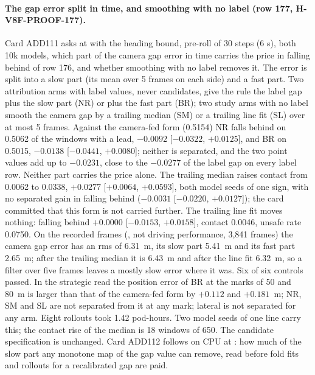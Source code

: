 \paragraph{The gap error split in time, and smoothing with no label (row 177, H-V8F-PROOF-177).} Card ADD111 asks at  with the heading bound, pre-roll of 30 steps (6 s), both 10k models, which part of the camera gap error in time carries the price in falling behind of row 176, and whether smoothing with no label removes it. The error is split into a slow part (its mean over 5 frames on each side) and a fast part. Two attribution arms with label values, never candidates, give the rule the label gap plus the slow part (NR) or plus the fast part (BR); two study arms with no label smooth the camera gap by a trailing median (SM) or a trailing line fit (SL) over at most 5 frames. Against the camera-fed form (0.5154) NR falls behind on 0.5062 of the windows with a lead, $-0.0092$ [$-0.0322$, $+0.0125$], and BR on 0.5015, $-0.0138$ [$-0.0441$, $+0.0080$]; neither is separated, and the two point values add up to $-0.0231$, close to the $-0.0277$ of the label gap on every label row. Neither part carries the price alone. The trailing median raises contact from 0.0062 to 0.0338, $+0.0277$ [$+0.0064$, $+0.0593$], both model seeds of one sign, with no separated gain in falling behind ($-0.0031$ [$-0.0220$, $+0.0127$]); the card committed that this form is not carried further. The trailing line fit moves nothing: falling behind $+0.0000$ [$-0.0153$, $+0.0158$], contact 0.0046, unsafe rate 0.0750. On the recorded frames (, not driving performance, 3,841 frames) the camera gap error has an rms of 6.31~m, its slow part 5.41~m and its fast part 2.65~m; after the trailing median it is 6.43~m and after the line fit 6.32~m, so a filter over five frames leaves a mostly slow error where it was. Six of six controls passed. In the strategic read the position error of BR at the marks of 50 and 80~m is larger than that of the camera-fed form by $+0.112$ and $+0.181$~m; NR, SM and SL are not separated from it at any mark; lateral is not separated for any arm. Eight rollouts took 1.42 pod-hours. Two model seeds of one line carry this; the contact rise of the median is 18 windows of 650. The candidate specification is unchanged. Card ADD112 follows on CPU at : how much of the slow part any monotone map of the gap value can remove, read before fold fits and rollouts for a recalibrated gap are paid.

